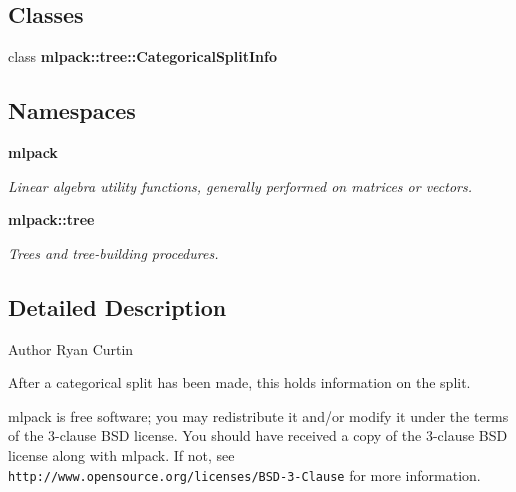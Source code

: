 \subsection*{Classes}
\begin{DoxyCompactItemize}
\item 
class {\bf mlpack\+::tree\+::\+Categorical\+Split\+Info}
\end{DoxyCompactItemize}
\subsection*{Namespaces}
\begin{DoxyCompactItemize}
\item 
 {\bf mlpack}
\begin{DoxyCompactList}\small\item\em Linear algebra utility functions, generally performed on matrices or vectors. \end{DoxyCompactList}\item 
 {\bf mlpack\+::tree}
\begin{DoxyCompactList}\small\item\em Trees and tree-\/building procedures. \end{DoxyCompactList}\end{DoxyCompactItemize}


\subsection{Detailed Description}
\begin{DoxyAuthor}{Author}
Ryan Curtin
\end{DoxyAuthor}
After a categorical split has been made, this holds information on the split.

mlpack is free software; you may redistribute it and/or modify it under the terms of the 3-\/clause B\+SD license. You should have received a copy of the 3-\/clause B\+SD license along with mlpack. If not, see {\tt http\+://www.\+opensource.\+org/licenses/\+B\+S\+D-\/3-\/\+Clause} for more information. 